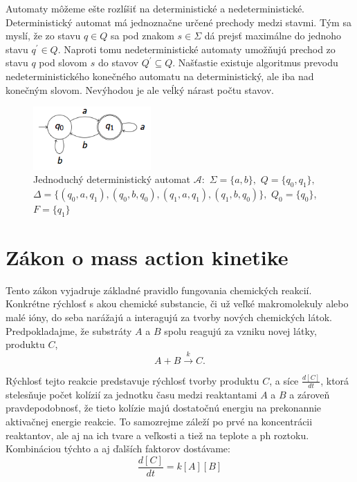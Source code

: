 \documentclass[11pt,final,oneside]{fithesis}
\begin{document}
Automaty m\^ o\v zeme e\v ste rozl\'i\v si\v t na deterministick\'e a nedeterministick\'e. Deterministick\' y automat m\'a jednozna\v cne ur\v cen\'e prechody 
medzi stavmi. T\'ym sa mysl\'i, \v ze zo stavu $q \in Q$ sa pod znakom $s \in \Sigma$ d\'a prejs\v t maxim\'alne do jednoho stavu $q^{'} \in Q$. Naproti tomu
nedeterministick\'e automaty umo\v z\v nuj\'u prechod zo stavu $q$ pod slovom $s$ do stavov $Q^{'} \subseteq Q$. Na\v s\v tastie existuje algoritmus prevodu 
nedeterministick\'eho kone\v cn\'eho automatu  na deterministick\'y, ale iba nad kone\v cn\'ym slovom. Nev\'yhodou je ale ve\'lk\'y n\'arast po\v ctu stavov.
\cite{Clarke:MC:BA}
\begin{figure}[h]
	\centering
	\includegraphics[width=0.4\textwidth]{buchi1}
	\caption{Jednoduch\'y deterministick\'y automat $\mathcal{A} :$ $\Sigma = \{a,b\},$ $Q = \{q_0,q_1\},$ $\Delta = \{(q_0,a,q_1),(q_0,b,q_0),(q_1,a,q_1),(q_1,b,q_0)\},$ 
	$Q_0 = \{q_0\}$, $F = \{q_1\}$}
	\label{fig:buchi}
\end{figure}

\section{Z\'akon o mass action kinetike}
\label{sec:massAction}
%
Tento z\'akon vyjadruje z\'akladn\'e pravidlo fungovania chemick\'ych reakci\'i. Konkr\'etne r\'ychlos\v t s akou chemick\'e substancie, \v ci u\v z 
ve\v lk\'e makromolekuly alebo mal\'e i\'ony, do seba nar\'a\v zaj\'u a interaguj\'u za tvorby nov\'ych chemick\'ych l\'atok. Predpokladajme, \v ze
substr\'aty $A$ a $B$ spolu reaguj\'u za vzniku novej l\'atky, produktu $C$,
\begin{equation}
\label{eq:simpleReaction}
A + B \overset{k}{\longrightarrow} C.
\end{equation}

R\'ychlos\v t tejto reakcie predstavuje r\'ychlos\v t tvorby produktu $C$, a s\'ice $\frac{d[C]}{dt}$, ktor\'a steles\v nuje po\v cet kol\'izi\'i za jednotku 
\v casu medzi reaktantami $A$ a $B$ a z\'arove\v n pravdepodobnos\v t, \v ze tieto kol\'izie maj\'u dostato\v cn\'u energiu na prekonannie aktiva\v cnej 
energie reakcie. To samozrejme z\'ale\v z\'i po prv\'e na koncentr\'acii reaktantov, ale aj na ich tvare a ve\v lkosti a tie\v z na teplote a ph roztoku. 
Kombin\'aciou t\'ychto a aj \v dal\v s\'ich faktorov dost\'avame:
\begin{equation}
\label{eq:differentialReaction}
\frac{d[C]}{dt} = k[A][B]
\end{equation}
\end{document}
